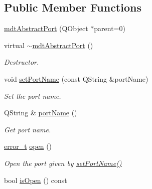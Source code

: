 \subsection*{Public Member Functions}
\begin{DoxyCompactItemize}
\item 
\hyperlink{classmdt_abstract_port_a35e7bff9413690833c832bf115da102f}{mdtAbstractPort} (QObject $\ast$parent=0)
\item 
virtual \hyperlink{classmdt_abstract_port_aa40baa0c593fef984f3796acafceee15}{$\sim$mdtAbstractPort} ()
\begin{DoxyCompactList}\small\item\em Destructor. \end{DoxyCompactList}\item 
void \hyperlink{classmdt_abstract_port_a0ca143d32fc677bac7c1cf0e04144932}{setPortName} (const QString \&portName)
\begin{DoxyCompactList}\small\item\em Set the port name. \end{DoxyCompactList}\item 
\hypertarget{classmdt_abstract_port_ac52fbd121f7cbb848a2f3e5d29fae615}{
QString \& \hyperlink{classmdt_abstract_port_ac52fbd121f7cbb848a2f3e5d29fae615}{portName} ()}
\label{classmdt_abstract_port_ac52fbd121f7cbb848a2f3e5d29fae615}

\begin{DoxyCompactList}\small\item\em Get port name. \end{DoxyCompactList}\item 
\hyperlink{classmdt_abstract_port_ad4121bb930c95887e77f8bafa065a85e}{error\_\-t} \hyperlink{classmdt_abstract_port_a4e0f0b7f9e24257677184e4bde10fdde}{open} ()
\begin{DoxyCompactList}\small\item\em Open the port given by \hyperlink{classmdt_abstract_port_a0ca143d32fc677bac7c1cf0e04144932}{setPortName()} \end{DoxyCompactList}\item 
\hypertarget{classmdt_abstract_port_a2122ae3141342ff38c8388e62b244e3b}{
bool \hyperlink{classmdt_abstract_port_a2122ae3141342ff38c8388e62b244e3b}{isOpen} () const }
\label{classmdt_abstract_port_a2122ae3141342ff38c8388e62b244e3b}


\end{DoxyCompactItemize}
